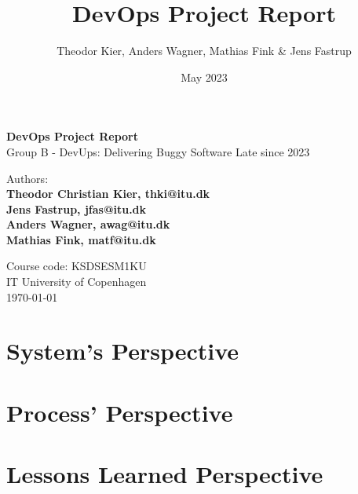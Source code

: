 \documentclass[a4paper,11pt]{article}
\title{DevOps Project Report}
\author{Theodor Kier, Anders Wagner, Mathias Fink & Jens Fastrup }
\date{May 2023}
\begin{document}
\begin{titlepage}
    \begin{center}
        \vspace*{1cm}

        \Huge
        \textbf{DevOps Project Report}\\
        \Large
        Group B - DevUps: Delivering Buggy Software Late since 2023
        \vspace{1.0cm}

        \Large
        Authors:\\  
        \textbf{Theodor Christian Kier, thki@itu.dk} \\
        \textbf{Jens Fastrup, jfas@itu.dk} \\
        \textbf{Anders Wagner, awag@itu.dk} \\
        \textbf{Mathias Fink, matf@itu.dk} \\
        
        \vfill

        Course code: KSDSESM1KU \\
        IT University of Copenhagen\\
        \today
    \end{center}
\end{titlepage}


\section{System's Perspective}





\section{Process' Perspective}





\section{Lessons Learned Perspective}


\newpage


\newpage
\printbibliography

\newpage

\end{document}
